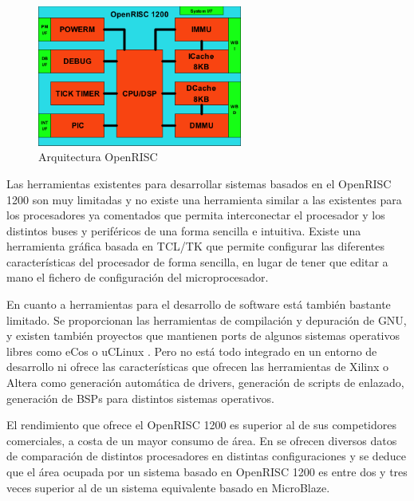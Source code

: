 \begin{figure}[h!]
 	\begin{center}
  	\includegraphics[width=0.6\textwidth,keepaspectratio=true]{./images/OR1200}
  	\caption{Arquitectura OpenRISC}
 	\end{center}
	\end{figure}


Las herramientas existentes para desarrollar sistemas basados en el OpenRISC 1200 son muy limitadas y no existe una herramienta similar a las existentes para los procesadores ya comentados que permita interconectar el procesador y los distintos buses y periféricos de una forma sencilla e intuitiva. Existe una herramienta gráfica basada en TCL/TK que permite configurar las diferentes características del procesador de forma sencilla\cite{Etiqueta29}, en lugar de tener que editar a mano el fichero de configuración del microprocesador.

En cuanto a herramientas para el desarrollo de software está también bastante limitado. Se proporcionan las herramientas de compilación y depuración de GNU, y existen también proyectos que mantienen ports de algunos sistemas operativos libres como eCos\cite{Etiqueta30} o uCLinux \cite{Etiqueta31}. Pero no está todo integrado en un entorno de desarrollo ni ofrece las características que ofrecen las herramientas de Xilinx o Altera como generación automática de drivers, generación de scripts de enlazado, generación de BSPs para distintos sistemas operativos.

El rendimiento que ofrece el OpenRISC 1200 es superior al de sus competidores comerciales, a costa de un mayor consumo de área. En \cite{Etiqueta32} se ofrecen diversos datos de comparación de distintos procesadores en distintas configuraciones y se deduce que el área ocupada por un sistema basado en OpenRISC 1200 es entre dos y tres veces superior al de un sistema equivalente basado en MicroBlaze.

